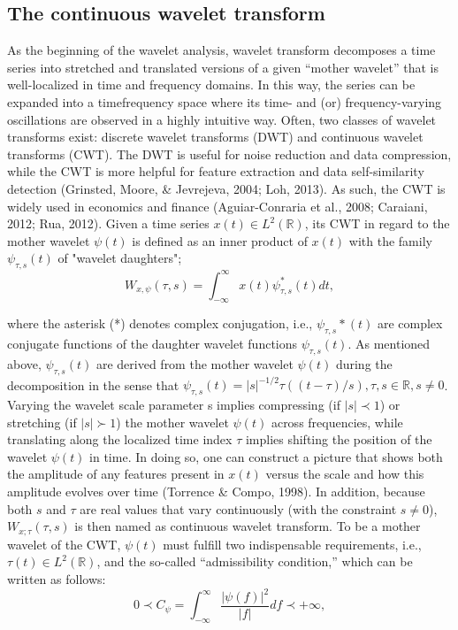\documentclass[a4paper,fleqn]{cas-sc}
\begin{document}
\subsection{The continuous wavelet transform}
As the beginning of the wavelet analysis, wavelet transform decomposes a time series into stretched and translated versions of a given “mother wavelet” that is well-localized in time and frequency domains. In this way, the series can be expanded into a timefrequency space where its time- and (or) frequency-varying oscillations are observed in a highly intuitive way. Often, two classes of wavelet transforms exist: discrete wavelet transforms (DWT) and continuous wavelet transforms (CWT). The DWT is useful for noise reduction and data compression, while the CWT is more helpful for feature extraction and data self-similarity detection (Grinsted, Moore, \& Jevrejeva, 2004; Loh, 2013). As such, the CWT is widely used in economics and finance (Aguiar-Conraria et al., 2008; Caraiani, 2012; Rua, 2012).
Given a time series $x(t)\in L^2(\mathbb{R})$, its CWT in regard to the mother wavelet $\psi(t)$ is defined as an inner product of $x(t)$ with the family $\psi_{\tau,s}(t)$ of "wavelet daughters";
\begin{equation}
    W_{x,\psi}(\tau,s)=\int_{-\infty}^{\infty}x(t)\psi_{\tau,s}^*(t)dt,
\end{equation}

where the asterisk (*) denotes complex conjugation, i.e., $\psi_{\tau,s}*(t)$ are complex conjugate functions of the daughter wavelet functions $\psi_{\tau,s}(t)$. As mentioned above, $\psi_{\tau,s}(t)$ are derived from the mother wavelet $\psi(t)$ during the decomposition in the sense that $\psi_{\tau,s}(t)=|s|^{-1/2}\tau((t - \tau)/s), \tau, s \in \mathbb{R}, s \neq 0$. Varying the wavelet scale parameter s implies compressing (if $|s| \prec 1$) or stretching (if $|s| \succ 1$) the mother wavelet $\psi(t)$ across frequencies, while translating along the localized time index $\tau$ implies shifting the position of the wavelet $\psi(t)$ in time. In doing so, one can construct a picture that shows both the amplitude of any features present in $x(t)$ versus the scale and how this amplitude evolves over time (Torrence \& Compo, 1998). In addition, because both $s$ and $\tau$ are real values that vary continuously (with the constraint $s \neq 0$), $W_{x;\tau}(\tau, s)$ is then named as continuous wavelet transform.
To be a mother wavelet of the CWT, $\psi(t)$ must fulfill two indispensable requirements, i.e., $\tau(t)\in L^2 (\mathbb{R})$, and the so-called “admissibility condition,” which can be written as follows:
\begin{equation}
    0 \prec C_\psi = \int_{-\infty}^\infty\frac{|\psi(f)|^2}{|f|}d f \prec + \infty,
\end{equation}
\end{document}
